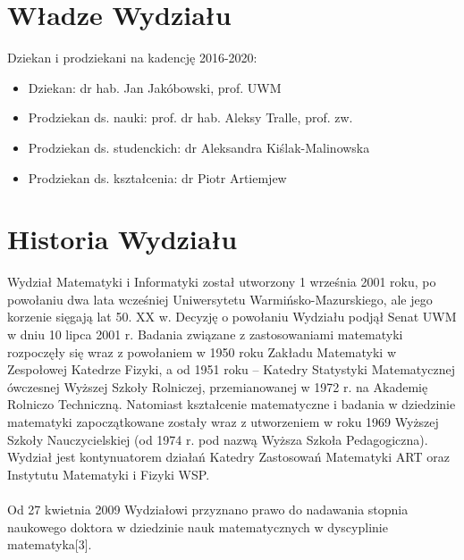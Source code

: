 \documentclass[a4paper,12pt]{article}
\begin{document}
\section{Władze Wydziału}
Dziekan i prodziekani na kadencję 2016-2020:\\
\begin{itemize}
\item Dziekan: dr hab. Jan Jakóbowski, prof. UWM
\item Prodziekan ds. nauki: prof. dr hab. Aleksy Tralle, prof. zw.
\item Prodziekan ds. studenckich: dr Aleksandra Kiślak-Malinowska
\item Prodziekan ds. kształcenia: dr Piotr Artiemjew

\end{itemize}

\section{Historia Wydziału}

Wydział Matematyki i Informatyki został utworzony 1 września 2001 roku, po powołaniu dwa lata wcześniej
Uniwersytetu Warmińsko-Mazurskiego, ale jego korzenie sięgają lat 50. XX w. Decyzję o powołaniu Wydziału
podjął Senat UWM w dniu 10 lipca 2001 r. Badania związane z zastosowaniami matematyki rozpoczęły się
wraz z powołaniem w 1950 roku Zakładu Matematyki w Zespołowej Katedrze Fizyki, a od 1951 roku –
Katedry Statystyki Matematycznej ówczesnej Wyższej Szkoły Rolniczej, przemianowanej w 1972 r. na
Akademię Rolniczo Techniczną. Natomiast kształcenie matematyczne i badania w dziedzinie matematyki
zapoczątkowane zostały wraz z utworzeniem w roku 1969 Wyższej Szkoły Nauczycielskiej (od 1974 r. pod
nazwą Wyższa Szkoła Pedagogiczna). Wydział jest kontynuatorem działań Katedry Zastosowań Matematyki
ART oraz Instytutu Matematyki i Fizyki WSP.
\\
\\Od 27 kwietnia 2009 Wydziałowi przyznano prawo do nadawania stopnia naukowego doktora w dziedzinie
nauk matematycznych w dyscyplinie matematyka[3].
\end{document}
